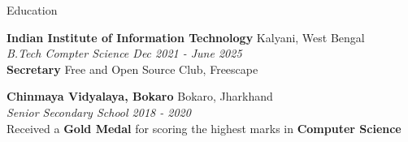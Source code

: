 \documentclass{resume} %
\begin{document}
	



	
	
	\begin{rSection}{Education}
		
		{\bf Indian Institute of Information Technology}  \hfill {Kalyani, West Bengal}\\
		\textit{B.Tech Compter Science \hfill {Dec 2021 - June 2025}}\\
		\textbf{Secretary} Free and Open Source Club, Freescape 
		
		{\bf Chinmaya Vidyalaya, Bokaro}  \hfill {Bokaro, Jharkhand}\\
		\textit{Senior Secondary School \hfill {2018 - 2020}} \\
		Received a \textbf{Gold Medal} for scoring the highest marks in \textbf{Computer Science}
		
	\end{rSection}
\end{document}

